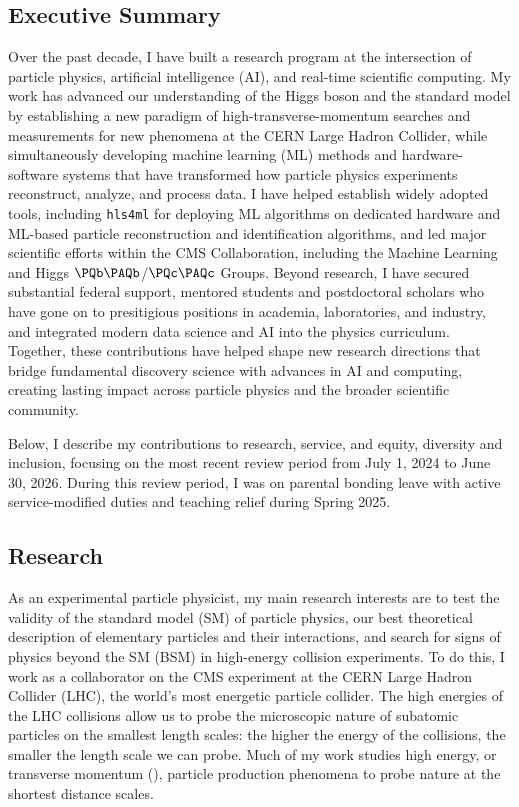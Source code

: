 \documentclass[11pt,letterpaper,notitlepage]{article}
\begin{document}
\pagestyle{fancyplain}

\vspace{-1ex}
\subsection*{Executive Summary}
Over the past decade, I have built a research program at the intersection of particle physics, artificial intelligence (AI), and real-time scientific computing.
My work has advanced our understanding of the Higgs boson and the standard model by establishing a new paradigm of high-transverse-momentum searches and measurements for new phenomena at the CERN Large Hadron Collider, while simultaneously developing machine learning (ML) methods and hardware-software systems that have transformed how particle physics experiments reconstruct, analyze, and process data.
I have helped establish widely adopted tools, including \texttt{hls4ml} for deploying ML algorithms on dedicated hardware and ML-based particle reconstruction and identification algorithms, and led major scientific efforts within the CMS Collaboration, including the Machine Learning and Higgs $\bbbar$/$\ccbar$ Groups.
Beyond research, I have secured substantial federal support, mentored students and postdoctoral scholars who have gone on to presitigious positions in academia, laboratories, and industry, and integrated modern data science and AI into the physics curriculum.
Together, these contributions have helped shape new research directions that bridge fundamental discovery science with advances in AI and computing, creating lasting impact across particle physics and the broader scientific community.

Below, I describe my contributions to research, service, and equity, diversity and inclusion, focusing on the most recent review period from July 1, 2024 to June 30, 2026.
During this review period, I was on parental bonding leave with active service-modified duties and teaching relief during Spring 2025.

\vspace{-1ex}
\subsection*{Research}

As an experimental particle physicist, my main research interests are to test the validity of the standard model (SM) of particle physics, our best theoretical description of elementary particles and their interactions, and search for signs of physics beyond the SM (BSM) in high-energy collision experiments.
To do this, I work as a collaborator on the CMS experiment at the CERN Large Hadron Collider (LHC), the world's most energetic particle collider.
The high energies of the LHC collisions allow us to probe the microscopic nature of subatomic particles on the smallest length scales: the higher the energy of the collisions, the smaller the length scale we can probe.
Much of my work studies high energy, or transverse momentum (\pt), particle production phenomena to probe nature at the shortest distance scales.
\end{document}
